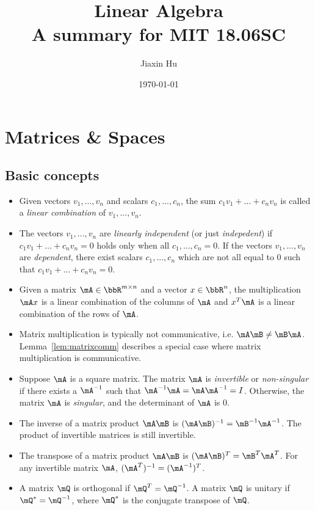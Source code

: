 \documentclass[11pt]{article}
\title{\textbf{Linear Algebra}\\A summary for MIT 18.06SC}
\date{\today}
\author{%
Jiaxin Hu
}
\theoremstyle{plain}
\theoremstyle{definition}
\begin{document}

\maketitle


\section{Matrices \& Spaces}
\subsection{Basic concepts}
\begin{itemize}
    \item Given vectors $v_1 ,...,v_n$ and scalars $c_1, ..., c_n$, the sum $c_1 v_1 + \dots + c_n v_n$ is called a \textit{linear combination} of $v_1,...,v_n$.
    \item The vectors  $v_1 ,...,v_n$  are \textit{linearly independent} (or just \textit{indepedent}) if $c_1 v_1 + \dots + c_n v_n = 0$ holds only when all  $c_1,...,c_n = 0$. If the vectors  $v_1 ,...,v_n$  are \textit{dependent}, there exist scalars $c_1, ..., c_n$ which are not all equal to 0 such that $c_1 v_1 + \dots + c_n v_n = 0$.
	\item Given a matrix $\mA \in \bbR^{m \times n}$ and a vector $x \in \bbR^{n}$,  the multiplication $\mA x$ is a linear combination of the columns of $\mA$ and $x^T \mA$ is a linear combination of the rows of $\mA$.
	\item Matrix multiplication is typically not communicative, i.e. $\mA \mB \neq \mB \mA$. Lemma~\ref{lem:matrixcomm} describes a special case where matrix multiplication is communicative.
	\item Suppose $\mA$ is a square matrix. The matrix $\mA$ is \textit{invertible} or \textit{non-singular} if there exists a $\mA^{-1}$ such that $\mA^{-1} \mA = \mA \mA^{-1} = I$. Otherwise, the matrix $\mA$ is \textit{singular}, and the determinant of $\mA$ is 0. 
	\item The inverse of a matrix product $\mA\mB$ is $(\mA \mB)^{-1} = \mB^{-1} \mA^{-1}$. The product of invertible matrices is still invertible.
	\item The transpose of a matrix product  $\mA\mB$ is $(\mA \mB)^{T} = \mB^{T} \mA^{T}$. For any invertible matrix $\mA$, $(\mA^T)^{-1} = (\mA^{-1})^T$.
	\item A matrix $\mQ$ is orthogonal if $\mQ^T = \mQ^{-1}$. A matrix $\mQ$ is unitary if $\mQ^* = \mQ^{-1}$, where $\mQ^*$ is the conjugate transpose of $\mQ$.
\end{itemize}
\end{document}

